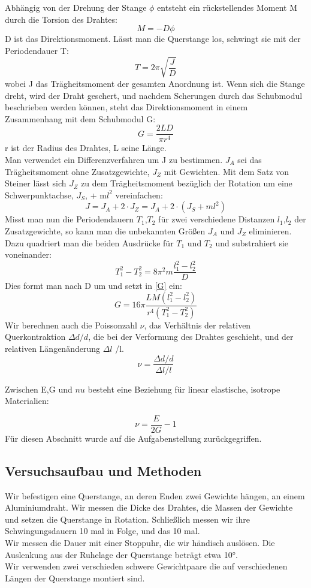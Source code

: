 \documentclass{article}
\begin{document}
Abhängig von der Drehung der Stange $\phi$ entsteht ein rückstellendes Moment M durch die Torsion des Drahtes:
$$M=-D\phi$$
D ist das Direktionsmoment. Lässt man die Querstange los, schwingt sie mit der Periodendauer T:
$$T=2\pi \sqrt{\frac{J}{D}}$$
wobei J das Trägheitsmoment der gesamten Anordnung ist. Wenn sich die Stange dreht, wird der Draht geschert, und nachdem Scherungen durch das Schubmodul beschrieben werden können, steht das Direktionsmoment in einem Zusammenhang mit dem Schubmodul G:
\begin{equation} 
\label{G}
G = \frac{2LD}{\pi r^4}
\end{equation}
r ist der Radius des Drahtes, L seine Länge. \\
Man verwendet ein Differenzverfahren um J zu bestimmen. $J_A$ sei das Trägheitsmoment ohne Zusatzgewichte, $J_Z$ mit Gewichten. Mit dem Satz von Steiner lässt sich $J_Z$ zu dem Trägheitsmoment bezüglich der Rotation um eine Schwerpunktachse, $J_S$, + m$l^2$ vereinfachen:
\begin{equation} \label{J}
J =  J_A + 2\cdot J_Z = J_A + 2 \cdot (J_S + ml^2)
\end{equation} 
Misst man nun die Periodendauern $T_1$,$T_2$ für zwei verschiedene Distanzen $l_1$,$l_2$ der Zusatzgewichte, so kann man die unbekannten Größen $J_A$ und $J_Z$ eliminieren. Dazu quadriert man die beiden Ausdrücke für $T_1$ und $T_2$ und substrahiert sie voneinander: 
$$T_1^2-T_2^2 = 8 \pi^2m\frac{l_1^2-l_2^2}{D}$$
Dies formt man nach D um und setzt in  \ref{G} ein:
\begin{equation}
\label{Gfinal}
G=16\pi\frac{LM(l_1^2-l_2^2)}{r^4(T_1^2-T_2^2)}
\end{equation} 
Wir berechnen auch die Poissonzahl $\nu$, das Verhältnis der relativen Querkontraktion $\Delta d / d$, die bei der Verformung des Drahtes geschieht, und der relativen Längenänderung $\Delta l$ /l.
$$\nu=\frac{\Delta d / d}{\Delta l / l} $$

Zwischen E,G und $nu$ besteht eine Beziehung für linear elastische, isotrope Materialien:

$$\nu = \frac{E}{2G} -1$$
Für diesen Abschnitt wurde auf die Aufgabenstellung zurückgegriffen.
\subsection{Versuchsaufbau und Methoden}
Wir befestigen eine Querstange, an deren Enden zwei Gewichte hängen, an einem Aluminiumdraht. Wir messen die Dicke des Drahtes, die Massen der Gewichte und setzen die Querstange in Rotation. Schließlich messen wir ihre Schwingungsdauern 10 mal in Folge, und das 10 mal. \\
Wir messen die Dauer mit einer Stoppuhr, die wir händisch auslösen. Die Auslenkung aus der Ruhelage der Querstange beträgt etwa 10°. \\
Wir verwenden zwei verschieden schwere Gewichtpaare die auf verschiedenen Längen der Querstange montiert sind.
\end{document}
